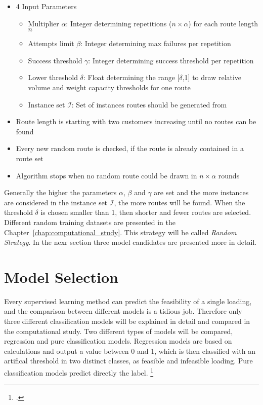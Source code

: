 \begin{itemize}
    \item 4 Input Parameters
          \begin{itemize}
              \item Multiplier $\alpha$: Integer determining repetitions ($n\times\alpha$) for each route length $n$
              \item  Attempts limit $\beta$: Integer determining max failures per repetition
              \item  Success threshold $\gamma$: Integer determining success threshold per repetition
              \item  Lower threshold $\delta$: Float determining the range [$\delta$,1] to draw relative volume and weight capacity thresholds for one route
              \item Instance set $\mathcal{I}$: Set of instances routes should be generated from
          \end{itemize}
    \item Route length is starting with two customers increasing until no routes can be found
    \item Every new random route is checked, if the route is already contained in a route set
    \item Algorithm stops when no random route could be drawn in $n \times \alpha$ rounds
\end{itemize}

Generally the higher the parameters $\alpha$, $\beta$ and $\gamma$ are set and the more instances
are considered in the instance set $\mathcal{I}$, the more routes will be found. When the threshold $\delta$
is chosen smaller than 1, then shorter and fewer routes are selected. Different
random training datasets are presented in the Chapter~\ref{chap:computational_study}.
This strategy will be called \textit{Random Strategy}. In the nexr section three model candidates
are presented more in detail.

\section{Model Selection}
\label{sec:modelselection}
Every supervised learning method can predict the feasibility of a single loading, and the comparison
between different models is a tidious job. Therefore only three different classification
models will be explained in detail and compared in the computational study.
Two different types of models will be compared, regression and pure classification models. Regression
models are based on calculations and output a value between 0 and 1, which is then classified with
an artifical threshold in two distinct classes, as feasible and infeasible loading. Pure classification
models predict directly the label. \footcite[cf.][p.5]{nasteski_overview_2017}

